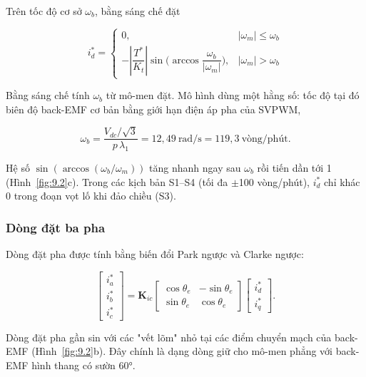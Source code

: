 Trên tốc độ cơ sở $\omega_b$, bằng sáng chế đặt

\begin{equation}
i_d^* = \begin{cases} 0, & |\omega_m| \le \omega_b \\[2pt] -\left|\dfrac{T^*}{K_t}\right| \sin\!\Big(\arccos\dfrac{\omega_b}{|\omega_m|}\Big), & |\omega_m| > \omega_b \end{cases}
\tag{9.4}\label{eq:9.4}
\end{equation}

Bằng sáng chế tính $\omega_b$ từ mô-men đặt. Mô hình dùng một hằng số: tốc độ tại đó biên độ back-EMF cơ bản bằng giới hạn điện áp pha của SVPWM,

\begin{equation}
\omega_b = \frac{V_{dc}/\sqrt3}{p\,\lambda_1} = 12{,}49\ \text{rad/s} = 119{,}3\ \text{vòng/phút}.
\tag{9.5}\label{eq:9.5}
\end{equation}

Hệ số $\sin(\arccos(\omega_b/\omega_m))$ tăng nhanh ngay sau $\omega_b$ rồi tiến dần tới 1 (Hình~\ref{fig:9.2}c). Trong các kịch bản S1–S4 (tối đa $\pm$100 vòng/phút), $i_d^*$ chỉ khác 0 trong đoạn vọt lố khi đảo chiều (S3).

\subsubsection{Dòng đặt ba pha}\label{sec:9.2.4}

Dòng đặt pha được tính bằng biến đổi Park ngược và Clarke ngược:

\begin{equation}
\begin{bmatrix} i_a^* \\ i_b^* \\ i_c^* \end{bmatrix} = \mathbf{K}_{ic}
\begin{bmatrix} \cos\theta_e & -\sin\theta_e \\ \sin\theta_e & \cos\theta_e \end{bmatrix}
\begin{bmatrix} i_d^* \\ i_q^* \end{bmatrix}.
\tag{9.6}\label{eq:9.6}
\end{equation}

Dòng đặt pha gần sin với các "vết lõm" nhỏ tại các điểm chuyển mạch của back-EMF (Hình~\ref{fig:9.2}b). Đây chính là dạng dòng giữ cho mô-men phẳng với back-EMF hình thang có sườn 60°.

